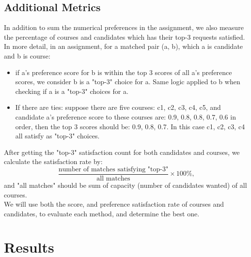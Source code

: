 \documentclass[twoside,twocolumn]{article}
\begin{document}
    \subsection{Additional Metrics}
    In addition to sum the numerical preferences in the assignment, we also measure the percentage of courses and candidates which has their top-3
    requests satisfied. In more detail, in an assignment, for a matched pair (a, b), which a is candidate and b is course:
    \begin{itemize}
        \item if a's preference score for b is within the top 3 scores of all a's preference scores, we consider b is a "top-3" choice for a. Same logic
        applied to b when checking if a is a "top-3" choices for a.
        \item If there are ties: suppose there are five courses: c1, c2, c3, c4, c5, and candidate a's preference score to these courses are: 0.9, 0.8, 0.8, 0.7,
        0.6 in order, then the top 3 scores should be: 0.9, 0.8, 0.7. In this case c1, c2, c3, c4 all satisfy as "top-3" choices.
    \end{itemize}
    After getting the "top-3" satisfaction count for both candidates and courses, we calculate the satisfaction rate by:
    $$\frac{\text{number of matches satisfying "top-3"}}{\text{all matches}} \times 100\%\text{,}$$
    and "all matches" should be sum of capacity (number of candidates wanted) of all courses.
    \\ We will use both the score, and preference satisfaction rate of courses and candidates, to evaluate each method, and determine the best one.
    \section{Results}
\end{document}
